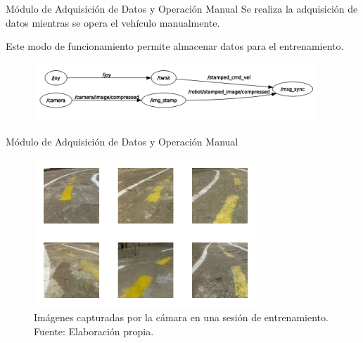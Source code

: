\documentclass[10pt]{beamer}
\begin{document}

\begin{frame}{Módulo de Adquisición de Datos y Operación Manual}
    Se realiza la adquisición de datos mientras se opera el vehículo manualmente.
    
    Este modo de funcionamiento permite almacenar datos para el entrenamiento.

    \begin{figure}[!h] 
        \centering
        \includegraphics[width=0.95\textwidth]{../img/nodosdaq}
        \end{figure}
    
\end{frame}


\begin{frame}{Módulo de Adquisición de Datos y Operación Manual}
    \begin{figure}[!h] 
        \centering
        \includegraphics[width=0.75\textwidth]{../img/fotosejemplo}
        \caption[Imágenes capturadas por la cámara en una sesión de entrenamiento]{Imágenes capturadas por la cámara en una sesión de entrenamiento. Fuente: Elaboración propia. }
    \end{figure}
    
\end{frame}
\end{document}
